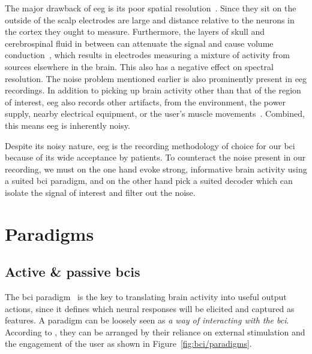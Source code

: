 The major drawback of \ac{eeg} is its poor spatial resolution~\cite{Ferree2001}.
Since they sit on the outside of the scalp electrodes are large and distance
relative to the neurons in the cortex they ought to measure.
Furthermore, the layers of skull and cerebrospinal fluid in between can
attenuate the signal and cause volume conduction~\cite{Broek1998}, which results in electrodes
measuring a mixture of activity from sources elsewhere in the brain.
This also has a negative effect on spectral resolution.
The noise problem mentioned earlier is also prominently present in \ac{eeg}
recordings.
In addition to picking up brain activity other than that of the region of
interest, \ac{eeg} also records other artifacts, from the environment, the power
supply, nearby electrical equipment, or the user's muscle
movements~\cite{Urigueen2015}.
Combined, this means \ac{eeg} is inherently noisy.

Despite its noisy nature, \ac{eeg} is the recording methodology of choice for
our \ac{bci} because of its wide acceptance by patients.
To counteract the noise present in our recording, we must on the one hand evoke
strong, informative brain activity using a suited \ac{bci} paradigm, and on the
other hand pick a suited decoder which can isolate the signal of interest and
filter out the noise.

\section{Paradigms}
\label{sec:bci/paradigms}

\subsection{Active \& passive \acsp{bci}}

The \ac{bci} paradigm~\cite{Xu2021,Neeling2019} is the key to translating brain activity into useful
output actions, since it defines which neural responses will be elicited and
captured as features.
A paradigm can be loosely seen as \emph{a way of interacting with the
\ac{bci}}.
According to \textcite{Zander2011}, they can be arranged by their reliance on
external stimulation and the engagement of the user as shown in
Figure~\ref{fig:bci/paradigms}.


